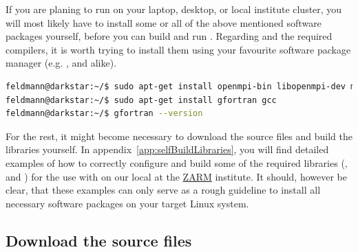 \documentclass[a4paper, 11pt, DIV=11]{scrartcl}
\begin{document}
If you are planing to run \nsc on your laptop, desktop, or local institute
cluster, you will most likely have to install some or all of the above
mentioned software packages yourself, before you can build and run \nsc.
Regarding \mpi and the required compilers, it is worth trying to install
them using your favourite software package manager (e.g. ,
 and alike).
\begin{lstlisting}[language=bash]
feldmann@darkstar:~/$ sudo apt-get install openmpi-bin libopenmpi-dev mpi-default-dev
feldmann@darkstar:~/$ sudo apt-get install gfortran gcc
feldmann@darkstar:~/$ gfortran --version
\end{lstlisting}
For the rest, it might become necessary to download the source files and
build the libraries yourself. In appendix~\ref{app:selfBuildLibraries}, you
will find detailed examples of how to correctly configure and build some
of the required libraries (,  and \hdf) for the use
with \nsc on our local  at the
\href{https://www.zarm.uni-bremen.de/en/}{ZARM} institute. It should,
however be clear, that these examples can only serve as a rough guideline
to install all necessary software packages on your target Linux system.

\subsection{Download the source files}
\label{sec:download}
\end{document}

